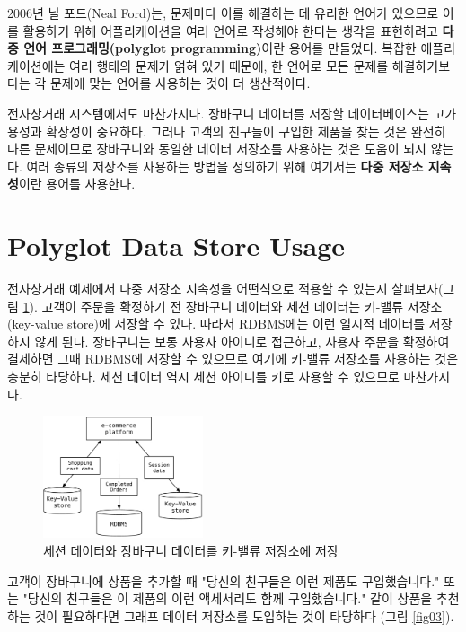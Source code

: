 \documentclass[twocolumn]{article}
\begin{document}
2006년 닐 포드(Neal Ford)는, 문제마다 이를 해결하는 데 유리한 언어가 있으므로 이를 활용하기 위해 어플리케이션을 여러 언어로 작성해야 한다는 생각을 표현하려고 \textbf{다중 언어 프로그래밍(polyglot programming)}이란 용어를 만들었다. 복잡한 애플리케이션에는 여러 행태의 문제가 얽혀 있기 때문에, 한 언어로 모든 문제를 해결하기보다는 각 문제에 맞는 언어를 사용하는 것이 더 생산적이다.

전자상거래 시스템에서도 마찬가지다. 장바구니 데이터를 저장할 데이터베이스는 고가용성과 확장성이 중요하다. 그러나 고객의 친구들이 구입한 제품을 찾는 것은 완전히 다른 문제이므로 장바구니와 동일한 데이터 저장소를 사용하는 것은 도움이 되지 않는다. 여러 종류의 저장소를 사용하는 방법을 정의하기 위해 여기서는 \textbf{다중 저장소 지속성}이란 용어를 사용한다.

\section{Polyglot Data Store Usage}
전자상거래 예제에서 다중 저장소 지속성을 어떤식으로 적용할 수 있는지 살펴보자(그림 \ref{fig02}).
고객이 주문을 확정하기 전 장바구니 데이터와 세션 데이터는 키-밸류 저장소(key-value store)에 저장할 수 있다.
따라서 RDBMS에는 이런 일시적 데이터를 저장하지 않게 된다. 장바구니는 보통 사용자 아이디로 접근하고, 사용자 주문을 확정하여 결제하면 그때 RDBMS에 저장할 수 있으므로 여기에 키-밸류 저장소를 사용하는 것은 충분히 타당하다. 세션 데이터 역시 세션 아이디를 키로 사용할 수 있으므로 마찬가지다.

\begin{figure}[!t]
        \centering
        \includegraphics[width=0.42\textwidth]{session}
        \caption{세션 데이터와 장바구니 데이터를 키-밸류 저장소에 저장}
        \label{fig02}
\end{figure}

고객이 장바구니에 상품을 추가할 때 "당신의 친구들은 이런 제품도 구입했습니다." 또는 "당신의 친구들은 이 제품의 이런 액세서리도 함께 구입했습니다." 같이 상품을 추천하는 것이 필요하다면 그래프 데이터 저장소를 도입하는 것이 타당하다 (그림 \ref{fig03}).
\end{document}
